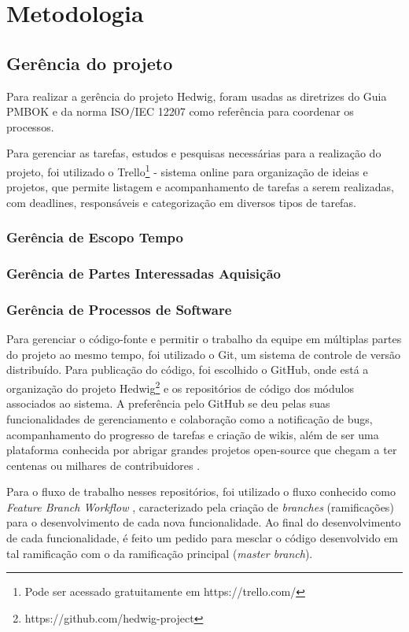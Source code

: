 \chapter{Metodologia}

\section{Gerência do projeto}
Para realizar a gerência do projeto Hedwig, foram usadas as diretrizes do Guia PMBOK \cite{pmi} e da norma ISO/IEC 12207 \cite{iso12207} como referência para coordenar os processos.

Para gerenciar as tarefas, estudos e pesquisas necessárias para a realização do projeto, foi utilizado o Trello\footnote{Pode ser acessado gratuitamente em https://trello.com/} - sistema online para organização de ideias e projetos, que permite listagem e acompanhamento de tarefas a serem realizadas, com deadlines, responsáveis e categorização em diversos tipos de tarefas.

\subsection{Gerência de Escopo Tempo}
\subsection{Gerência de Partes Interessadas Aquisição}
\subsection{Gerência de Processos de Software}
Para gerenciar o código-fonte e permitir o trabalho da equipe em múltiplas partes do projeto ao mesmo tempo, foi utilizado o Git, um sistema de controle de versão distribuído. Para publicação do código, foi escolhido o GitHub, onde está a organização do projeto Hedwig\footnote{https://github.com/hedwig-project} e os repositórios de código dos módulos associados ao sistema. A preferência pelo GitHub se deu pelas suas funcionalidades de gerenciamento e colaboração como a notificação de bugs, acompanhamento do progresso de tarefas e criação de wikis, além de ser uma plataforma conhecida por abrigar grandes projetos open-source que chegam a ter centenas ou milhares de contribuidores \cite{github}.

Para o fluxo de trabalho nesses repositórios, foi utilizado o fluxo conhecido como \textit{Feature Branch Workflow} \cite{atlassian}, caracterizado pela criação de \textit{branches} (ramificações) para o desenvolvimento de cada nova funcionalidade. Ao final do desenvolvimento de cada funcionalidade, é feito um pedido para mesclar o código desenvolvido em tal ramificação com o da ramificação principal (\textit{master branch}).

